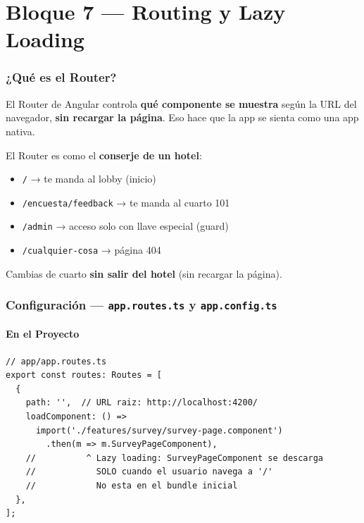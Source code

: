 \documentclass[12pt, a4paper]{article}
\begin{document}
\newpage
\part{ Bloque 7 --- Routing y Lazy Loading}

\section{  ¿Qué es el Router?}

El Router de Angular controla \textbf{qué componente se muestra} según la URL del navegador,
\textbf{sin recargar la página}. Eso hace que la app se sienta como una app nativa.

\begin{tcolorbox}[analogia, title={\emoji{hotel} \emoji{key} El Conserje del Hotel}]
  El Router es como el \textbf{conserje de un hotel}:\\
  \begin{itemize}
    \item {} \texttt{/} → te manda al lobby (inicio)
    \item {} \texttt{/encuesta/feedback} → te manda al cuarto 101
    \item {} \texttt{/admin} → acceso solo con llave especial (guard)
    \item {} \texttt{/cualquier-cosa} → página 404
  \end{itemize}
  Cambias de cuarto \textbf{sin salir del hotel} (sin recargar la página).
\end{tcolorbox}

\section{  Configuración --- \texttt{app.routes.ts} y \texttt{app.config.ts}}

\subsection{ En el Proyecto}

\begin{lstlisting}
// app/app.routes.ts
export const routes: Routes = [
  {
    path: '',  // URL raiz: http://localhost:4200/
    loadComponent: () =>
      import('./features/survey/survey-page.component')
        .then(m => m.SurveyPageComponent),
    //          ^ Lazy loading: SurveyPageComponent se descarga
    //            SOLO cuando el usuario navega a '/'
    //            No esta en el bundle inicial
  },
];
\end{lstlisting}
\end{document}
